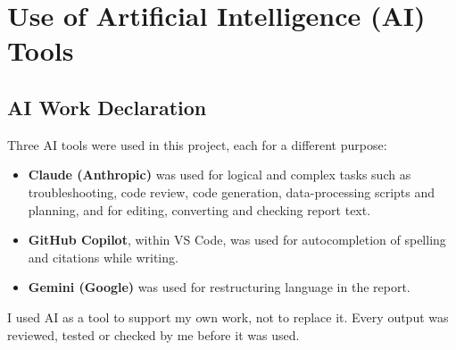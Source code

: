 \chapter{Use of Artificial Intelligence (AI) Tools}
\label{app:ai}

\section{AI Work Declaration}
\label{app:ai_work}

Three AI tools were used in this project, each for a different purpose:
\begin{itemize}[label=\textbullet]
  \item \textbf{Claude (Anthropic)} was used for logical and complex tasks
    such as troubleshooting, code review, code generation, data-processing
    scripts and planning, and for editing, converting and checking report
    text.
  \item \textbf{GitHub Copilot}, within VS Code, was used for
    autocompletion of spelling and citations while writing.
  \item \textbf{Gemini (Google)} was used for restructuring language in
    the report.
\end{itemize}
I used AI as a tool to support my own work, not to replace it. Every
output was reviewed, tested or checked by me before it was used.

